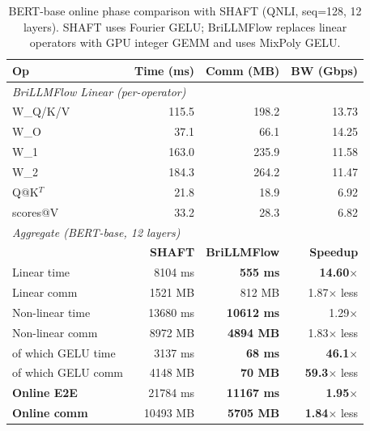 \begin{table}[t]
\centering
\caption{BERT-base online phase comparison with SHAFT (QNLI, seq=128, 12 layers). SHAFT uses Fourier GELU; BriLLMFlow replaces linear operators with GPU integer GEMM and uses MixPoly GELU.}
\label{tab:bert_shaft_comparison}
\setlength{\tabcolsep}{4pt}
\footnotesize
\begin{tabular}{lrrr}
\toprule
\textbf{Op} & \textbf{Time (ms)} & \textbf{Comm (MB)} & \textbf{BW (Gbps)} \\
\midrule
\multicolumn{4}{l}{\textit{BriLLMFlow Linear (per-operator)}} \\
W\_Q/K/V    & 115.5 & 198.2 & 13.73 \\
W\_O        & 37.1 & 66.1 & 14.25 \\
W\_1        & 163.0 & 235.9 & 11.58 \\
W\_2        & 184.3 & 264.2 & 11.47 \\
Q@K$^T$     & 21.8 & 18.9 & 6.92 \\
scores@V    & 33.2 & 28.3 & 6.82 \\
\midrule
\multicolumn{4}{l}{\textit{Aggregate (BERT-base, 12 layers)}} \\
                       & \textbf{SHAFT} & \textbf{BriLLMFlow} & \textbf{Speedup} \\
Linear time            & 8104 ms & \textbf{555 ms} & \textbf{14.60}$\times$ \\
Linear comm            & 1521 MB & 812 MB & 1.87$\times$ less \\
Non-linear time        & 13680 ms & \textbf{10612 ms} & 1.29$\times$ \\
Non-linear comm        & 8972 MB & \textbf{4894 MB} & 1.83$\times$ less \\
\quad of which GELU time & 3137 ms & \textbf{68 ms} & \textbf{46.1}$\times$ \\
\quad of which GELU comm & 4148 MB & \textbf{70 MB} & \textbf{59.3}$\times$ less \\
\midrule
\textbf{Online E2E}    & 21784 ms & \textbf{11167 ms} & \textbf{1.95}$\times$ \\
\textbf{Online comm}   & 10493 MB & \textbf{5705 MB} & \textbf{1.84}$\times$ less \\
\bottomrule
\end{tabular}
\end{table}
